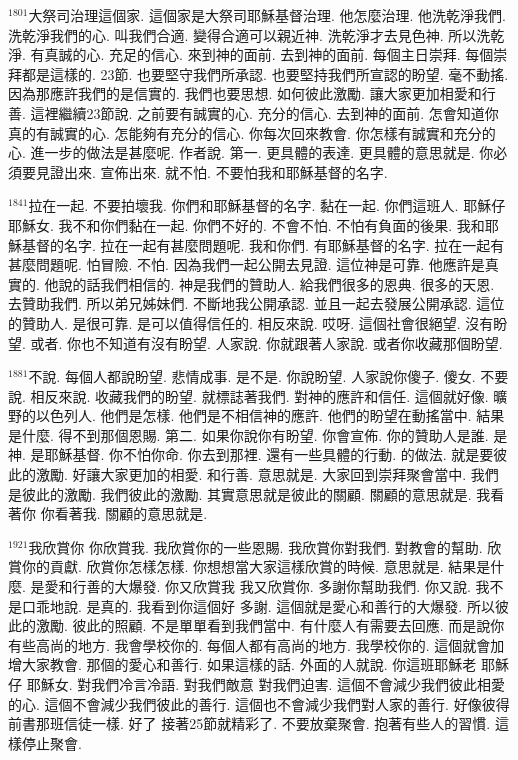 \documentclass{book}
\begin{document}
$^{1801}$大祭司治理這個家.
這個家是大祭司耶穌基督治理.
他怎麼治理.
他洗乾淨我們.
洗乾淨我們的心.
叫我們合適.
變得合適可以親近神.
洗乾淨才去見色神.
所以洗乾淨.
有真誠的心.
充足的信心.
來到神的面前.
去到神的面前.
每個主日崇拜.
每個崇拜都是這樣的.
23節.
也要堅守我們所承認.
也要堅持我們所宣認的盼望.
毫不動搖.
因為那應許我們的是信實的.
我們也要思想.
如何彼此激勵.
讓大家更加相愛和行善.
這裡繼續23節說.
之前要有誠實的心.
充分的信心.
去到神的面前.
怎會知道你真的有誠實的心.
怎能夠有充分的信心.
你每次回來教會.
你怎樣有誠實和充分的心.
進一步的做法是甚麼呢.
作者說.
第一.
更具體的表達.
更具體的意思就是.
你必須要見證出來.
宣佈出來.
就不怕.
不要怕我和耶穌基督的名字.

$^{1841}$拉在一起.
不要拍壞我.
你們和耶穌基督的名字.
黏在一起.
你們這班人.
耶穌仔 耶穌女.
我不和你們黏在一起.
你們不好的.
不會不怕.
不怕有負面的後果.
我和耶穌基督的名字.
拉在一起有甚麼問題呢.
我和你們.
有耶穌基督的名字.
拉在一起有甚麼問題呢.
怕冒險.
不怕.
因為我們一起公開去見證.
這位神是可靠.
他應許是真實的.
他說的話我們相信的.
神是我們的贊助人.
給我們很多的恩典.
很多的天恩.
去贊助我們.
所以弟兄姊妹們.
不斷地我公開承認.
並且一起去發展公開承認.
這位的贊助人.
是很可靠.
是可以值得信任的.
相反來說.
哎呀.
這個社會很絕望.
沒有盼望.
或者.
你也不知道有沒有盼望.
人家說.
你就跟著人家說.
或者你收藏那個盼望.

$^{1881}$不說.
每個人都說盼望.
悲情成事.
是不是.
你說盼望.
人家說你傻子.
傻女.
不要說.
相反來說.
收藏我們的盼望.
就標誌著我們.
對神的應許和信任.
這個就好像.
曠野的以色列人.
他們是怎樣.
他們是不相信神的應許.
他們的盼望在動搖當中.
結果是什麼.
得不到那個恩賜.
第二.
如果你說你有盼望.
你會宣佈.
你的贊助人是誰.
是神.
是耶穌基督.
你不怕你命.
你去到那裡.
還有一些具體的行動.
的做法.
就是要彼此的激勵.
好讓大家更加的相愛.
和行善.
意思就是.
大家回到崇拜聚會當中.
我們是彼此的激勵.
我們彼此的激勵.
其實意思就是彼此的關顧.
關顧的意思就是.
我看著你 你看著我.
關顧的意思就是.

$^{1921}$我欣賞你 你欣賞我.
我欣賞你的一些恩賜.
我欣賞你對我們.
對教會的幫助.
欣賞你的貢獻.
欣賞你怎樣怎樣.
你想想當大家這樣欣賞的時候.
意思就是.
結果是什麼.
是愛和行善的大爆發.
你又欣賞我 我又欣賞你.
多謝你幫助我們.
你又說.
我不是口乖地說.
是真的.
我看到你這個好 多謝.
這個就是愛心和善行的大爆發.
所以彼此的激勵.
彼此的照顧.
不是單單看到我們當中.
有什麼人有需要去回應.
而是說你有些高尚的地方.
我會學校你的.
每個人都有高尚的地方.
我學校你的.
這個就會加增大家教會.
那個的愛心和善行.
如果這樣的話.
外面的人就說.
你這班耶穌老 耶穌仔 耶穌女.
對我們冷言冷語.
對我們敵意 對我們迫害.
這個不會減少我們彼此相愛的心.
這個不會減少我們彼此的善行.
這個也不會減少我們對人家的善行.
好像彼得前書那班信徒一樣.
好了 接著25節就精彩了.
不要放棄聚會.
抱著有些人的習慣.
這樣停止聚會.
\end{document}

